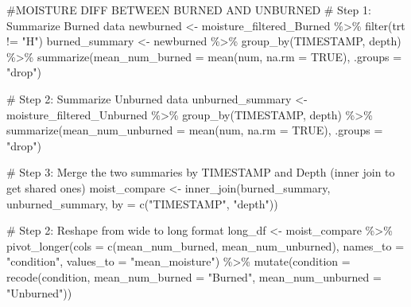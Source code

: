 \documentclass[
  letterpaper,
  DIV=11,
  numbers=noendperiod]{scrartcl}
\newenvironment{Shaded}{\begin{snugshade}}{\end{snugshade}}
\newcommand{\AttributeTok}[1]{\textcolor[rgb]{0.40,0.45,0.13}{#1}}
\newcommand{\CommentTok}[1]{\textcolor[rgb]{0.37,0.37,0.37}{#1}}
\newcommand{\ConstantTok}[1]{\textcolor[rgb]{0.56,0.35,0.01}{#1}}
\newcommand{\FunctionTok}[1]{\textcolor[rgb]{0.28,0.35,0.67}{#1}}
\newcommand{\NormalTok}[1]{\textcolor[rgb]{0.00,0.23,0.31}{#1}}
\newcommand{\OtherTok}[1]{\textcolor[rgb]{0.00,0.23,0.31}{#1}}
\newcommand{\SpecialCharTok}[1]{\textcolor[rgb]{0.37,0.37,0.37}{#1}}
\newcommand{\StringTok}[1]{\textcolor[rgb]{0.13,0.47,0.30}{#1}}
\begin{document}
\begin{Shaded}
\begin{Highlighting}[]
\CommentTok{\#MOISTURE DIFF BETWEEN BURNED AND UNBURNED}
\CommentTok{\# Step 1: Summarize Burned data}
\NormalTok{newburned }\OtherTok{\textless{}{-}}\NormalTok{ moisture\_filtered\_Burned }\SpecialCharTok{\%\textgreater{}\%} \FunctionTok{filter}\NormalTok{(trt }\SpecialCharTok{!=} \StringTok{"H"}\NormalTok{)}
\NormalTok{burned\_summary }\OtherTok{\textless{}{-}}\NormalTok{ newburned }\SpecialCharTok{\%\textgreater{}\%}
  \FunctionTok{group\_by}\NormalTok{(TIMESTAMP, depth) }\SpecialCharTok{\%\textgreater{}\%}
  \FunctionTok{summarize}\NormalTok{(}\AttributeTok{mean\_num\_burned =} \FunctionTok{mean}\NormalTok{(num, }\AttributeTok{na.rm =} \ConstantTok{TRUE}\NormalTok{), }\AttributeTok{.groups =} \StringTok{"drop"}\NormalTok{)}

\CommentTok{\# Step 2: Summarize Unburned data}
\NormalTok{unburned\_summary }\OtherTok{\textless{}{-}}\NormalTok{ moisture\_filtered\_Unburned }\SpecialCharTok{\%\textgreater{}\%}
  \FunctionTok{group\_by}\NormalTok{(TIMESTAMP, depth) }\SpecialCharTok{\%\textgreater{}\%}
  \FunctionTok{summarize}\NormalTok{(}\AttributeTok{mean\_num\_unburned =} \FunctionTok{mean}\NormalTok{(num, }\AttributeTok{na.rm =} \ConstantTok{TRUE}\NormalTok{), }\AttributeTok{.groups =} \StringTok{"drop"}\NormalTok{)}

\CommentTok{\# Step 3: Merge the two summaries by TIMESTAMP and Depth (inner join to get shared ones)}
\NormalTok{moist\_compare }\OtherTok{\textless{}{-}} \FunctionTok{inner\_join}\NormalTok{(burned\_summary, unburned\_summary, }\AttributeTok{by =} \FunctionTok{c}\NormalTok{(}\StringTok{"TIMESTAMP"}\NormalTok{, }\StringTok{"depth"}\NormalTok{))}

\CommentTok{\# Step 2: Reshape from wide to long format}
\NormalTok{long\_df }\OtherTok{\textless{}{-}}\NormalTok{ moist\_compare }\SpecialCharTok{\%\textgreater{}\%}
  \FunctionTok{pivot\_longer}\NormalTok{(}\AttributeTok{cols =} \FunctionTok{c}\NormalTok{(mean\_num\_burned, mean\_num\_unburned),}
               \AttributeTok{names\_to =} \StringTok{"condition"}\NormalTok{,}
               \AttributeTok{values\_to =} \StringTok{"mean\_moisture"}\NormalTok{) }\SpecialCharTok{\%\textgreater{}\%}
  \FunctionTok{mutate}\NormalTok{(}\AttributeTok{condition =} \FunctionTok{recode}\NormalTok{(condition,}
                            \AttributeTok{mean\_num\_burned =} \StringTok{"Burned"}\NormalTok{,}
                            \AttributeTok{mean\_num\_unburned =} \StringTok{"Unburned"}\NormalTok{))}


\end{Highlighting}
\end{Shaded}
\end{document}
